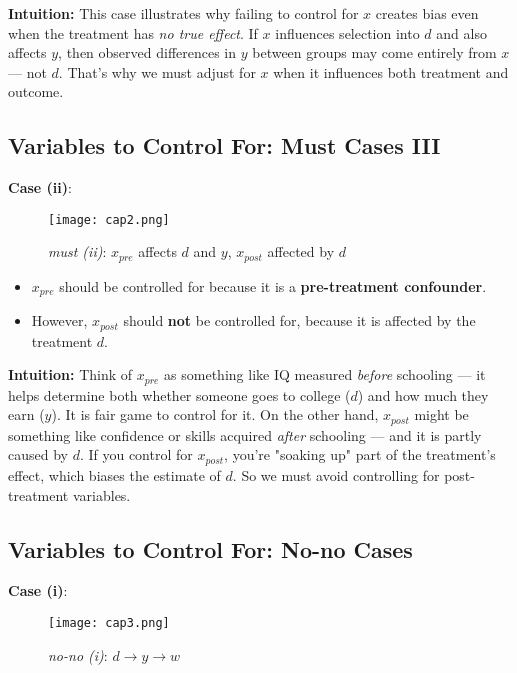 \documentclass[12pt]{article}
\begin{document}
\textbf{Intuition:}  
This case illustrates why failing to control for $x$ creates bias even when the treatment has \textit{no true effect}. If $x$ influences selection into $d$ and also affects $y$, then observed differences in $y$ between groups may come entirely from $x$ — not $d$. That’s why we must adjust for $x$ when it influences both treatment and outcome.

\subsection*{\noindent\textbf{Variables to Control For: Must Cases III}}

\textbf{Case (ii)}:  

\begin{figure}[H]
  \centering
  \texttt{[image: cap2.png]} %
  \caption*{\textit{must (ii)}: $x_{pre}$ affects $d$ and $y$, $x_{post}$ affected by $d$}
\end{figure}

\begin{itemize}
  \item $x_{pre}$ should be controlled for because it is a \textbf{pre-treatment confounder}.
  \item However, $x_{post}$ should \textbf{not} be controlled for, because it is affected by the treatment $d$.
\end{itemize}

\textbf{Intuition:}  
Think of $x_{pre}$ as something like IQ measured \textit{before} schooling — it helps determine both whether someone goes to college ($d$) and how much they earn ($y$). It is fair game to control for it.  
On the other hand, $x_{post}$ might be something like confidence or skills acquired \textit{after} schooling — and it is partly caused by $d$. If you control for $x_{post}$, you're "soaking up" part of the treatment's effect, which biases the estimate of $d$. So we must avoid controlling for post-treatment variables.

\subsection*{\noindent\textbf{Variables to Control For: No-no Cases}}

\textbf{Case (i)}:

\begin{figure}[H]
  \centering
  \texttt{[image: cap3.png]} %
  \caption*{\textit{no-no (i)}: $d \rightarrow y \rightarrow w$}
\end{figure}
\end{document}
